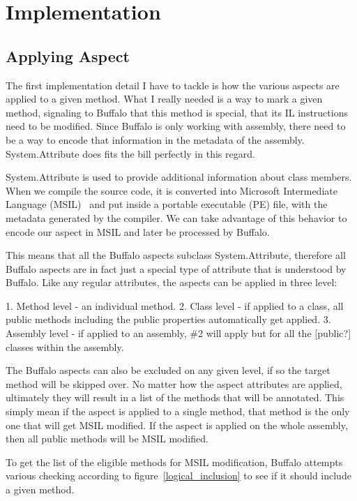 \chapter{Implementation}

\section{Applying Aspect}

The first implementation detail I have to tackle is how the various aspects are applied to a given method. What I really needed is a way to mark a given method, signaling to Buffalo that this method is special, that its IL instructions need to be modified. Since Buffalo is only working with assembly, there need to be a way to encode that information in the metadata of the assembly. System.Attribute does fits the bill perfectly in this regard.

System.Attribute is used to provide additional information about class members. When we compile the source code, it is converted into Microsoft Intermediate Language (MSIL)~\cite{msil_text} and put inside a portable executable (PE) file, with the metadata generated by the compiler. We can take advantage of this behavior to encode our aspect in MSIL and later be processed by Buffalo.

This means that all the Buffalo aspects subclass System.Attribute, therefore all Buffalo aspects are in fact just a special type of attribute that is understood by Buffalo. Like any regular attributes, the aspects can be applied in three level:

1. Method level - an individual method.
2. Class level - if applied to a class, all public methods including the public properties automatically get applied.
3. Assembly level - if applied to an assembly, \#2 will apply but for all the [public?] classes within the assembly.

The Buffalo aspects can also be excluded on any given level, if so the target method will be skipped over. No matter how the aspect attributes are applied, ultimately they will result in a list of the methods that will be annotated. This simply mean if the aspect is applied to a single method, that method is the only one that will get MSIL modified. If the aspect is applied on the whole assembly, then all public methods will be MSIL modified.

To get the list of the eligible methods for MSIL modification, Buffalo attempts various checking according to figure~\ref{logical_inclusion} to see if it should include a given method.

